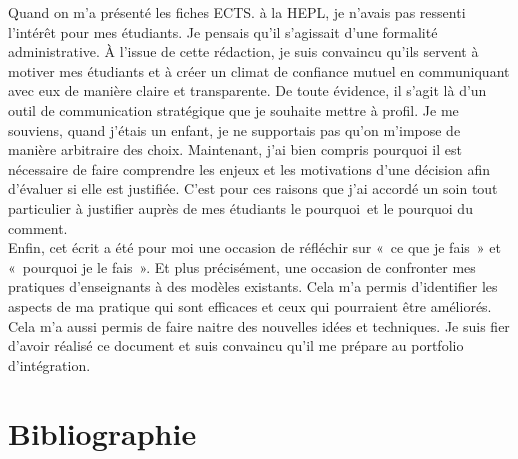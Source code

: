 Quand on m'a présenté les fiches ECTS. à la HEPL, je n'avais pas ressenti l'intérêt pour mes étudiants. Je pensais qu'il s'agissait d'une formalité administrative. À l'issue de cette rédaction, je suis convaincu qu'ils servent à motiver mes étudiants et à créer un climat de confiance mutuel en communiquant avec eux de manière claire et transparente. De toute évidence, il s'agit là d'un outil de communication stratégique que je souhaite mettre à profil. Je me souviens, quand j'étais un enfant, je ne supportais pas qu'on m'impose de manière arbitraire des choix. Maintenant, j'ai bien compris pourquoi il est nécessaire de faire comprendre les enjeux et les motivations d'une décision afin d’évaluer si elle est justifiée. C'est pour ces raisons que j'ai accordé un soin tout particulier à justifier auprès de mes étudiants le pourquoi~et le pourquoi du comment. \\
Enfin, cet écrit a été pour moi une occasion de réfléchir sur «~ce que je fais~» et «~pourquoi je le fais~». Et plus précisément, une occasion de confronter mes pratiques d'enseignants à des modèles existants. Cela m'a permis d’identifier les aspects de ma pratique qui sont efficaces et ceux qui pourraient être améliorés. Cela m'a aussi permis de faire naitre des nouvelles idées et techniques. Je suis fier d'avoir réalisé ce document et suis convaincu qu'il me prépare au portfolio d'intégration.


\clearpage
\section{Bibliographie}
\printbibliography[heading=none]

%
%






